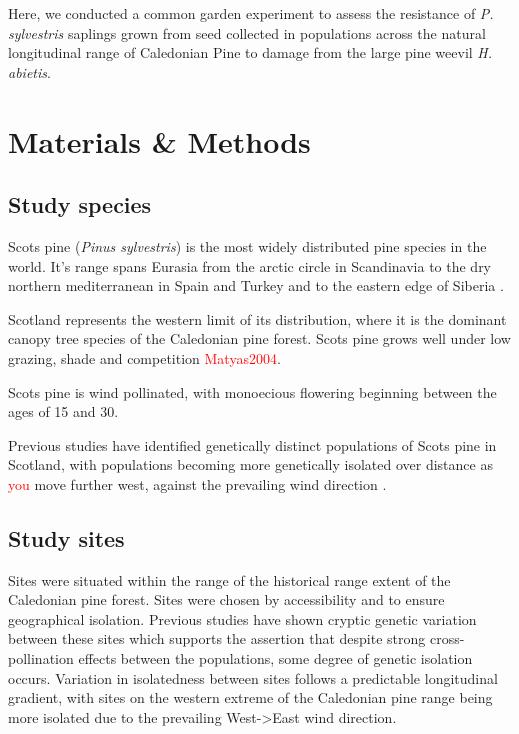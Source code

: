 \documentclass[a4paper, 11pt]{article}
\newcommand{\todo}[1]{\textcolor{red}{#1}}   %
\begin{document}
Here, we conducted a common garden experiment to assess the resistance of \textit{P. sylvestris} saplings grown from seed collected in populations across the natural longitudinal range of Caledonian Pine to damage from the large pine weevil \textit{H. abietis}. 


\section*{Materials \& Methods}

\subsection*{Study species}

Scots pine (\textit{Pinus sylvestris}) is the most widely distributed pine species in the world. It's range spans Eurasia from the arctic circle in Scandinavia to the dry northern mediterranean in Spain and Turkey and to the eastern edge of Siberia \citep{Carlisle1968}. 

Scotland represents the western limit of its distribution, where it is the dominant canopy tree species of the Caledonian pine forest. Scots pine grows well under low grazing, shade and competition \todo{Matyas2004}. 

Scots pine is wind pollinated, with monoecious flowering beginning between the ages of 15 and 30. 

Previous studies have identified genetically distinct populations of Scots pine in Scotland, with populations becoming more genetically isolated over distance as \todo{you} move further west, against the prevailing wind direction \citep{}. 

\subsection*{Study sites}

Sites were situated within the range of the historical range extent of the Caledonian pine forest. Sites were chosen by accessibility and to ensure geographical isolation. Previous studies have shown cryptic genetic variation between these sites \citep{Donnelly2018} which supports the assertion that despite strong cross-pollination effects between the populations, some degree of genetic isolation occurs. Variation in isolatedness between sites follows a predictable longitudinal gradient, with sites on the western extreme of the Caledonian pine range being more isolated due to the prevailing West->East wind direction.
\end{document}
